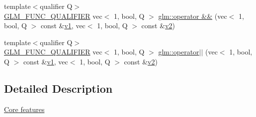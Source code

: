 \begin{DoxyCompactItemize}
\item 
{\footnotesize template$<$qualifier Q$>$ }\\\hyperlink{setup_8hpp_a33fdea6f91c5f834105f7415e2a64407}{G\+L\+M\+\_\+\+F\+U\+N\+C\+\_\+\+Q\+U\+A\+L\+I\+F\+I\+ER} vec$<$ 1, bool, Q $>$ \hyperlink{group__ext__vec1_ga5836cbb5b58489de3281dc7460e4f2ce}{glm\+::operator \&\&} (vec$<$ 1, bool, Q $>$ const \&\hyperlink{_s_d_l__opengl__glext_8h_a435c176a02c061b43e19bdf7c86cceae}{v1}, vec$<$ 1, bool, Q $>$ const \&\hyperlink{_s_d_l__opengl__glext_8h_a0928f6d0f0f794ba000a21dfae422136}{v2})
\item 
{\footnotesize template$<$qualifier Q$>$ }\\\hyperlink{setup_8hpp_a33fdea6f91c5f834105f7415e2a64407}{G\+L\+M\+\_\+\+F\+U\+N\+C\+\_\+\+Q\+U\+A\+L\+I\+F\+I\+ER} vec$<$ 1, bool, Q $>$ \hyperlink{group__ext__vec1_ga121908a337ee4ab94414dfd4f3518d47}{glm\+::operator$\vert$$\vert$} (vec$<$ 1, bool, Q $>$ const \&\hyperlink{_s_d_l__opengl__glext_8h_a435c176a02c061b43e19bdf7c86cceae}{v1}, vec$<$ 1, bool, Q $>$ const \&\hyperlink{_s_d_l__opengl__glext_8h_a0928f6d0f0f794ba000a21dfae422136}{v2})
\end{DoxyCompactItemize}


\subsection{Detailed Description}
\hyperlink{group__core}{Core features} 